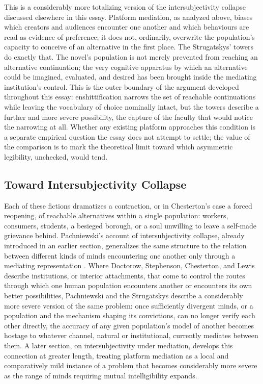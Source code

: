 \documentclass[11pt]{article}
\begin{document}
This is a considerably more totalizing version of the intersubjectivity collapse discussed elsewhere in this essay. Platform mediation, as analyzed above, biases which creators and audiences encounter one another and which behaviours are read as evidence of preference; it does not, ordinarily, overwrite the population's capacity to conceive of an alternative in the first place. The Strugatskys' towers do exactly that. The novel's population is not merely prevented from reaching an alternative continuation; the very cognitive apparatus by which an alternative could be imagined, evaluated, and desired has been brought inside the mediating institution's control. This is the outer boundary of the argument developed throughout this essay: enshittification narrows the set of reachable continuations while leaving the vocabulary of choice nominally intact, but the towers describe a further and more severe possibility, the capture of the faculty that would notice the narrowing at all. Whether any existing platform approaches this condition is a separate empirical question the essay does not attempt to settle; the value of the comparison is to mark the theoretical limit toward which asymmetric legibility, unchecked, would tend.

\subsection{Toward Intersubjectivity Collapse}

Each of these fictions dramatizes a contraction, or in Chesterton's case a forced reopening, of reachable alternatives within a single population: workers, consumers, students, a besieged borough, or a soul unwilling to leave a self-made grievance behind. Pachniewski's account of intersubjectivity collapse, already introduced in an earlier section, generalizes the same structure to the relation between different kinds of minds encountering one another only through a mediating representation \parencite{pachniewski2023intersubjectivity}. Where Doctorow, Stephenson, Chesterton, and Lewis describe institutions, or interior attachments, that come to control the routes through which one human population encounters another or encounters its own better possibilities, Pachniewski and the Strugatskys describe a considerably more severe version of the same problem: once sufficiently divergent minds, or a population and the mechanism shaping its convictions, can no longer verify each other directly, the accuracy of any given population's model of another becomes hostage to whatever channel, natural or institutional, currently mediates between them. A later section, on intersubjectivity under mediation, develops this connection at greater length, treating platform mediation as a local and comparatively mild instance of a problem that becomes considerably more severe as the range of minds requiring mutual intelligibility expands.
\end{document}
